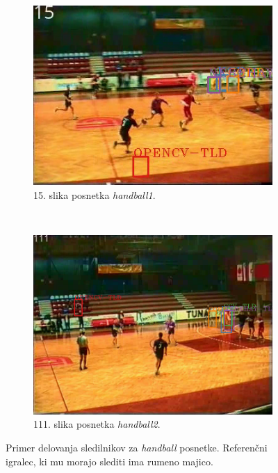 \begin{figure}[htb]
\centering

	\begin{subfigure}[t]{0.45\columnwidth}
      \includegraphics[width=\columnwidth]{./Slike/handball1-example.png}
      \caption{15. slika posnetka \textit{handball1}.}
      \label{fig:handball1}
    \end{subfigure}
    ~
    \begin{subfigure}[t]{0.45\columnwidth}
      \includegraphics[width=\columnwidth]{./Slike/handball2-example.png}
      \caption{111. slika posnetka \textit{handball2}.}
      \label{fig:handball2}
    \end{subfigure}  
\caption[Primer delovanja sledilnikov za \textit{handball} posnetke]{Primer delovanja sledilnikov za \textit{handball} posnetke. Referenčni igralec, ki mu morajo slediti ima rumeno majico. }
\label{fig:tracker-visual}
\end{figure}




